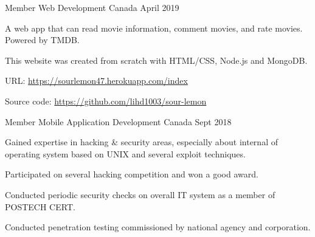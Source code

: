     


\begin{cventries}

  \cventry
    {Member} %
    {Web Development} %
    {Canada} %
    {April 2019} %
    {
      \begin{cvitems} %
        \item {A web app that can read movie information, comment movies, and rate movies. Powered by TMDB. }
        \item {This website was created from scratch with HTML/CSS, Node.js and MongoDB.}
        \item {URL: \url{https://sourlemon47.herokuapp.com/index}}
        \item {Source code: \url{https://github.com/lihd1003/sour-lemon}}
      \end{cvitems}
    }

  \cventry
    {Member} %
    {Mobile Application Development} %
    {Canada} %
    {Sept 2018} %
    {
      \begin{cvitems} %
        \item {Gained expertise in hacking \& security areas, especially about internal of operating system based on UNIX and several exploit techniques.}
        \item {Participated on several hacking competition and won a good award.}
        \item {Conducted periodic security checks on overall IT system as a member of POSTECH CERT.}
        \item {Conducted penetration testing commissioned by national agency and corporation.}
      \end{cvitems}
    }


\end{cventries}
